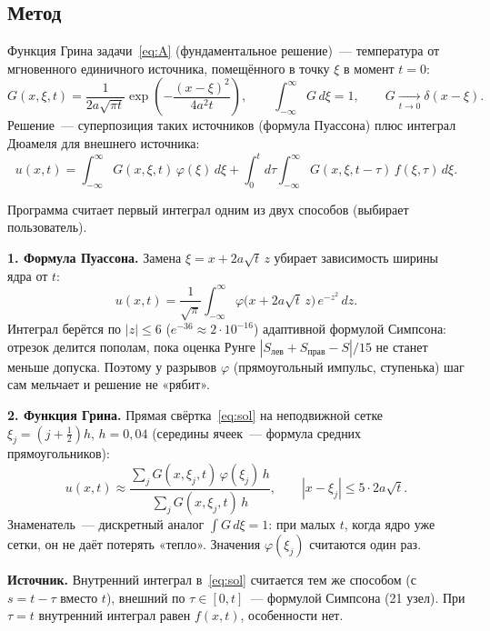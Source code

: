 \documentclass[a4paper,12pt]{article}
\begin{document}
\subsection{Метод}

Функция Грина задачи~\eqref{eq:A} (фундаментальное решение)~---
температура от мгновенного единичного источника, помещённого в точку $\xi$ в момент $t=0$:
\begin{equation}\label{eq:K}
  G(x,\xi,t)=\frac{1}{2a\sqrt{\pi t}}\exp\!\left(-\frac{(x-\xi)^2}{4a^2t}\right),\qquad
  \int_{-\infty}^{\infty}G\,d\xi=1,\qquad G\xrightarrow[t\to0]{}\delta(x-\xi).
\end{equation}
Решение~--- суперпозиция таких источников (формула Пуассона) плюс интеграл
Дюамеля для внешнего источника:
\begin{equation}\label{eq:sol}
  u(x,t)=\int_{-\infty}^{\infty}G(x,\xi,t)\,\varphi(\xi)\,d\xi
        +\int_{0}^{t}\!d\tau\int_{-\infty}^{\infty}G(x,\xi,t-\tau)\,f(\xi,\tau)\,d\xi .
\end{equation}

Программа считает первый интеграл одним из двух способов (выбирает пользователь).

\textbf{1. Формула Пуассона.} Замена $\xi=x+2a\sqrt{t}\,z$ убирает зависимость
ширины ядра от $t$:
\begin{equation}\label{eq:poisson}
  u(x,t)=\frac{1}{\sqrt\pi}\int_{-\infty}^{\infty}\varphi\bigl(x+2a\sqrt t\,z\bigr)\,e^{-z^2}\,dz .
\end{equation}
Интеграл берётся по $|z|\le 6$ ($e^{-36}\approx2\cdot10^{-16}$) адаптивной
формулой Симпсона: отрезок делится пополам, пока оценка Рунге
$|S_{\text{лев}}+S_{\text{прав}}-S|/15$ не станет меньше допуска. Поэтому
у разрывов $\varphi$ (прямоугольный импульс, ступенька) шаг сам мельчает и
решение не «рябит».

\textbf{2. Функция Грина.} Прямая свёртка~\eqref{eq:sol} на неподвижной сетке
$\xi_j=(j+\tfrac12)h$, $h=0{,}04$ (середины ячеек~--- формула средних прямоугольников):
\begin{equation}\label{eq:green}
  u(x,t)\approx\frac{\sum_j G(x,\xi_j,t)\,\varphi(\xi_j)\,h}{\sum_j G(x,\xi_j,t)\,h},
  \qquad |x-\xi_j|\le 5\cdot2a\sqrt t .
\end{equation}
Знаменатель~--- дискретный аналог $\int G\,d\xi=1$: при малых $t$, когда ядро
уже сетки, он не даёт потерять «тепло». Значения $\varphi(\xi_j)$ считаются один раз.

\textbf{Источник.} Внутренний интеграл в~\eqref{eq:sol} считается тем же
способом (с $s=t-\tau$ вместо $t$), внешний по $\tau\in[0,t]$~--- формулой
Симпсона (21 узел). При $\tau=t$ внутренний интеграл равен $f(x,t)$, особенности нет.
\end{document}
